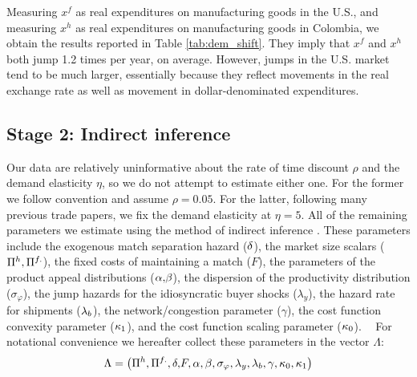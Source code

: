 Measuring $x^{f}$ as real expenditures on manufacturing goods in the U.S.,
and measuring $x^{h}$ as real expenditures on manufacturing goods in
Colombia, we obtain the results reported in Table \ref{tab:dem_shift}.%
\footnotemark{} They imply that $x^{f}$ and $x^{h}$ both jump 1.2 times per year, on
average. However, jumps in the U.S. market tend to be much larger,
essentially because they reflect movements in the real exchange rate as well
as movement in dollar-denominated expenditures.

\subsection{Stage 2: Indirect inference}

Our data are relatively uninformative about the rate of time discount $\rho $
and the demand elasticity $\eta $, so we do not attempt to estimate either
one$.$ For the former we follow convention and assume $\rho =0.05$. For the
latter, following many previous trade papers, we fix the demand elasticity
at $\eta =5.$ All of the remaining parameters we estimate using the method
of indirect inference \citep{gourieroux1997simulation}. These parameters
include the exogenous match separation hazard (${\small \delta }$), the
market size scalars (${\small \Pi }^{h},{\small \Pi }^{f.}$), the fixed
costs of maintaining a match ($F$), the parameters of the product appeal
distributions (${\small \alpha }{\small ,}{\small \beta }$), the dispersion
of the productivity distribution ($\sigma _{\varphi }$), the jump hazards
for the idiosyncratic buyer shocks ($\lambda _{y}$), the hazard rate for
shipments (${\small \lambda }_{b}$), the network/congestion parameter ($%
\gamma $), the cost function convexity parameter (${\small \kappa _{1}}$),
and the cost function scaling parameter (${\small \kappa _{0}}$). \textbf{\ }%
For notational convenience we hereafter collect these parameters in the
vector $\Lambda :$%
\begin{equation*}
\Lambda =\left( {\small \Pi }^{h},{\small \Pi }^{f.},{\small \delta ,}F,%
{\small \alpha },{\small \beta },\sigma _{\varphi },\lambda _{y},{\small %
\lambda }_{b},{\small \gamma ,\kappa _{0},\kappa _{1}}\right)
\end{equation*}

